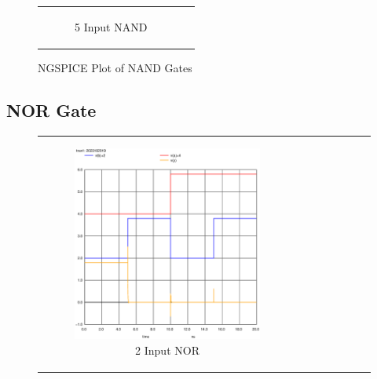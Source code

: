 \documentclass[conference]{IEEEtran}
\begin{document}
\begin{figure}[H]
\begin{tabular}{cc}
\begin{subfigure}{0.44\linewidth}
            \caption{5 Input NAND}
        \end{subfigure}
    \end{tabular}
    \caption{NGSPICE Plot of NAND Gates}
\end{figure}

\subsection{NOR Gate}

\begin{figure}[H]
    \centering
    \begin{tabular}{cc}
        \begin{subfigure}{0.44\linewidth}
            \centering
            \includegraphics[width=\textwidth]{images/nor_cmos_tran.eps}
            \caption{2 Input NOR}
        \end{subfigure} &
        \begin{subfigure}{0.44\linewidth}
            \centering

\end{subfigure}
\end{tabular}
\end{figure}
\end{document}
